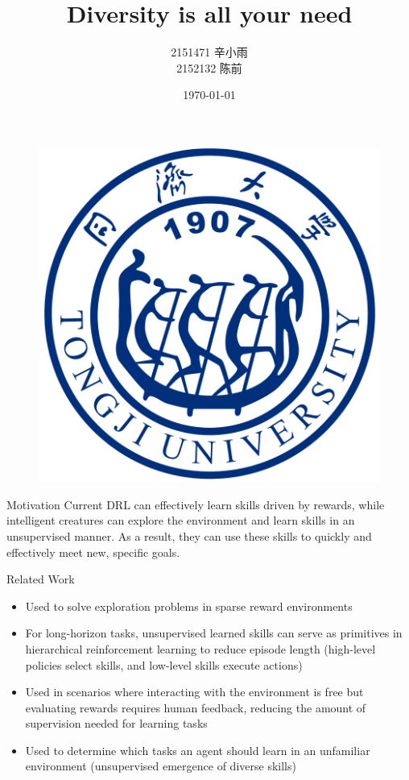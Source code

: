 \documentclass{beamer}
\author[同济大学国豪书院]
{
2151471 \quad 辛小雨
\\
2152132 \quad 陈前
}
\title{\textrm{Diversity is all your need}}
\institute
{
同济大学国豪书院
}
\date{\today}
\begin{document}
\begin{frame}
    \titlepage
    \begin{figure}[htpb]
       \begin{center}
            \includegraphics[width=0.2\linewidth]{pic/tongji_logo.png}
        \end{center}
    \end{figure}
\end{frame}

\begin{frame}{Motivation}
    Current DRL can effectively learn skills driven by rewards, while intelligent creatures can explore the environment and learn skills in an unsupervised manner. As a result, they can use these skills to quickly and effectively meet new, specific goals.
\end{frame}

\begin{frame}{Related Work}
	\footnotesize
	\begin{itemize}
		\item Used to solve exploration problems in sparse reward environments
		\vspace{0.2cm}
		\item For long-horizon tasks, unsupervised learned skills can serve as primitives in hierarchical reinforcement learning to reduce episode length (high-level policies select skills, and low-level skills execute actions)
		\vspace{0.2cm}
		\item Used in scenarios where interacting with the environment is free but evaluating rewards requires human feedback, reducing the amount of supervision needed for learning tasks\vspace{0.2cm}
		\item Used to determine which tasks an agent should learn in an unfamiliar environment (unsupervised emergence of diverse skills)
	\end{itemize}
\end{frame}
\end{document}

